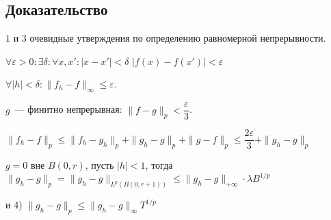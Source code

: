 \documentclass{article}
\begin{document}
        \subsection{Доказательство}
        
            $1$ и $3$ очевидные утверждения по определению равномерной непрерывности.
            
            $\forall \varepsilon > 0 : \exists \delta : \forall x, x' : |x - x'| < \delta$ $| f(x) - f(x')| < \varepsilon$
            
            $\forall |h| < \delta : \| f_h - f \|_{\infty} \leqslant \varepsilon$.
        
            $g$~--- финитно непрерывная: $\| f - g \|_p < \dfrac{\varepsilon}{3}$.
            
            $\| f_h - f \|_p \leqslant \| f_h - g_h \|_p + \| g_h - g \|_p + \| g - f \|_p \leqslant \dfrac{2 \varepsilon}{3} + \| g_h - g \|_p$
            
            $g = 0$ вне $B(0, r)$, пусть $|h| < 1$, тогда $\| g_h - g \|_p = \| g_h - g\|_{L^p \left( B(0, r + 1) \right)} \leqslant \| g_h - g \|_{+\infty} \cdot \lambda B^{1/p}$
            
            и 4) $\| g_h - g \|_p \leqslant \| g_h - g \|_{\infty} T^{1/p}$
            
            
\end{document}
